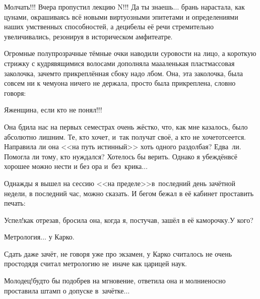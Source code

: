 \diagdash Молчать!!! Вчера пропустил лекцию N!!! Да ты знаешь$\ldots$ \mdash брань нарастала, как цунами, окрашиваясь всё новыми виртуозными эпитетами и определениями наших умственных способностей, а децибелы её речи стремительно увеличивались, резонируя в историческом амфитеатре.

Огромные полупрозрачные тёмные очки наводили суровости на лицо, а короткую стрижку с кудрявящимися волосами дополняла ма\sdash а\sdash аленькая пластмассовая заколочка, зачем\sdash то прикреплённая сбоку надо лбом. Она, эта заколочка, была совсем ни к чему\mdash она ничего не держала, просто была прикреплена, словно говоря:

\diagdash Я\mdash женщина, если кто не понял!!! 

Она бдила нас на первых семестрах очень жёстко, что, как мне казалось, было абсолютно лишним. Те, кто хочет, и~так получат своё, а кто не хочет\mdash отсеется. Направила ли она <<на путь истинный>> хоть одного раздолбая? Едва~ли. Помогла ли тому, кто нуждался? Хотелось бы верить. Однако я убеждён\mdash всё хорошее можно нести и без ора и~без~крика$\ldots$

Однажды я вышел на сессию <<на пределе>>\mdash в~последний день зачётной недели, в последний час, можно сказать. И бегом бежал в её кабинет проставить печать:

\diagdash Успел!\mdash как отрезав, бросила она, когда я, постучав, зашёл в её каморочку.\mdash У кого?

\diagdash Метрология$\ldots$ у Кар\sdash ко.

Сдать даже зачёт, не говоря уже про экзамен, у Кар\sdash ко считалось не очень просто\mdash дядя считал метрологию не~иначе как царицей наук.

\diagdash Молодец!\mdash будто бы подобрев на мгновение, ответила она и молниеносно проставила штамп о допуске в~зачётке$\ldots$

\begin{center}
\end{center}